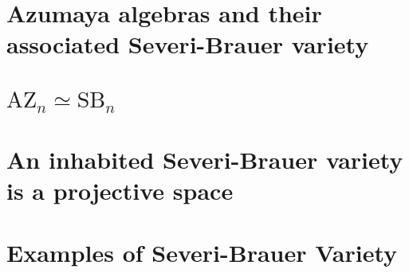 \documentclass{../util/zariski}
\newcommand{\SB}{\mathrm{SB}}
\newcommand{\AZ}{\mathrm{AZ}}
\begin{document}
\section{Azumaya algebras and their associated Severi-Brauer variety}


\section{$\AZ_n\simeq \SB_n$}


\section{An inhabited Severi-Brauer variety is a projective space}


\section{Examples of Severi-Brauer Variety}


\printindex

\printbibliography
\end{document}
